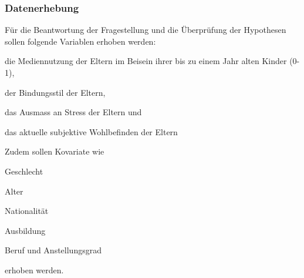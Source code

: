 \subsubsection{Datenerhebung}
Für die Beantwortung der Fragestellung und die Überprüfung der Hypothesen sollen folgende Variablen erhoben werden: 
\begin{seriate}
    \item die Mediennutzung der Eltern im Beisein ihrer bis zu einem Jahr alten Kinder (0-1),
    \item der Bindungsstil der Eltern, 
    \item das Ausmass an Stress der Eltern und
    \item das aktuelle subjektive Wohlbefinden der Eltern
\end{seriate}

Zudem sollen Kovariate wie 
\begin{seriate}
    \item Geschlecht
    \item Alter
    \item Nationalität
    \item Ausbildung
    \item Beruf und Anstellungsgrad
\end{seriate}
erhoben werden.

